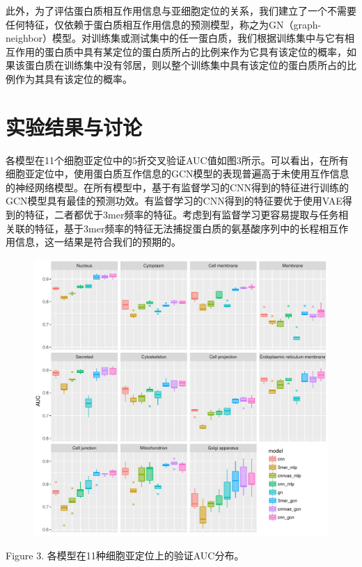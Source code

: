 \documentclass[a4paper,UTF8]{article}
\begin{document}
此外，为了评估蛋白质相互作用信息与亚细胞定位的关系，我们建立了一个不需要任何特征，仅依赖于蛋白质相互作用信息的预测模型，称之为GN（graph-neighbor）模型。对训练集或测试集中的任一蛋白质，我们根据训练集中与它有相互作用的蛋白质中具有某定位的蛋白质所占的比例来作为它具有该定位的概率，如果该蛋白质在训练集中没有邻居，则以整个训练集中具有该定位的蛋白质所占的比例作为其具有该定位的概率。

\section{实验结果与讨论}

各模型在11个细胞亚定位中的5折交叉验证AUC值如图3所示。可以看出，在所有细胞亚定位中，使用蛋白质互作信息的GCN模型的表现普遍高于未使用互作信息的神经网络模型。在所有模型中，基于有监督学习的CNN得到的特征进行训练的GCN模型具有最佳的预测功效。有监督学习的CNN得到的特征要优于使用VAE得到的特征，二者都优于3mer频率的特征。考虑到有监督学习更容易提取与任务相关联的特征，基于3mer频率的特征无法捕捉蛋白质的氨基酸序列中的长程相互作用信息，这一结果是符合我们的预期的。

\begin{figure}[H]
	\centering\includegraphics[scale=0.7]{../result/test_performance_AUC.pdf}
\end{figure}
Figure 3. 各模型在11种细胞亚定位上的验证AUC分布。\\
\end{document}
